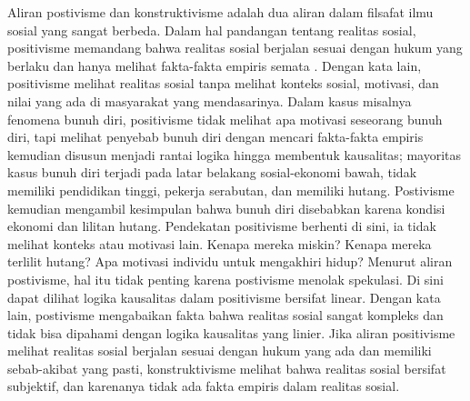 \question
\lipsum[1]
\begin{solution}
	Aliran postivisme dan konstruktivisme adalah dua aliran dalam filsafat ilmu sosial yang sangat berbeda. Dalam hal pandangan tentang realitas sosial, positivisme memandang bahwa realitas sosial berjalan sesuai dengan hukum yang berlaku dan hanya melihat fakta-fakta empiris semata \cite{armstrong_positivism_2013}.
	Dengan kata lain, positivisme melihat realitas sosial tanpa melihat konteks sosial, motivasi, dan nilai yang ada di masyarakat yang mendasarinya.
	Dalam kasus misalnya fenomena bunuh diri, positivisme tidak melihat apa motivasi seseorang bunuh diri, tapi melihat penyebab bunuh diri dengan mencari fakta-fakta empiris kemudian disusun menjadi rantai logika hingga membentuk kausalitas; mayoritas kasus bunuh diri terjadi pada latar belakang sosial-ekonomi bawah, tidak memiliki pendidikan tinggi, pekerja serabutan, dan memiliki hutang.
	Postivisme kemudian mengambil kesimpulan bahwa bunuh diri disebabkan karena kondisi ekonomi dan lilitan hutang.
	Pendekatan positivisme berhenti di sini, ia tidak melihat konteks atau motivasi lain.
	Kenapa mereka miskin? Kenapa mereka terlilit hutang? Apa motivasi individu untuk mengakhiri hidup?
	Menurut aliran postivisme, hal itu tidak penting karena postivisme menolak spekulasi.
	Di sini dapat dilihat logika kausalitas dalam positivisme bersifat linear.
	Dengan kata lain, postivisme mengabaikan fakta bahwa realitas sosial sangat kompleks dan tidak bisa dipahami dengan logika kausalitas yang linier.
	Jika aliran positivisme melihat realitas sosial berjalan sesuai dengan hukum yang ada dan memiliki sebab-akibat yang pasti, konstruktivisme melihat bahwa realitas sosial bersifat subjektif, dan karenanya tidak ada fakta empiris dalam realitas sosial.
	

\end{solution}
